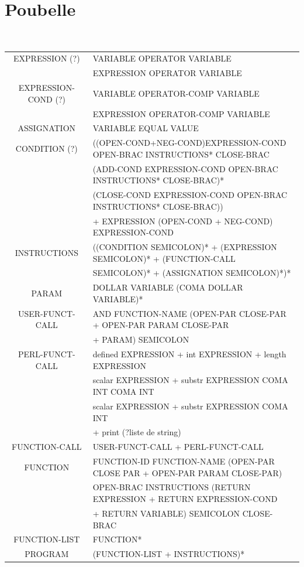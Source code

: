 \documentclass[a4paper,10pt]{article}
\begin{document}
\section{Poubelle}





~\\
\pagebreak
\hspace{-4.5cm}\begin{tabular}{|c|l|}
\hline
EXPRESSION (?)		& VARIABLE OPERATOR VARIABLE   \\
					& EXPRESSION OPERATOR VARIABLE \\ \hline
EXPRESSION-COND (?)	& VARIABLE OPERATOR-COMP VARIABLE   \\
					& EXPRESSION OPERATOR-COMP VARIABLE \\ \hline
ASSIGNATION			& VARIABLE EQUAL VALUE \\ \hline
CONDITION (?)		& ((OPEN-COND+NEG-COND)EXPRESSION-COND OPEN-BRAC INSTRUCTIONS* CLOSE-BRAC\\
					& (ADD-COND EXPRESSION-COND OPEN-BRAC INSTRUCTIONS* CLOSE-BRAC)* \\
					& (CLOSE-COND EXPRESSION-COND OPEN-BRAC INSTRUCTIONS* CLOSE-BRAC))\\
					& + EXPRESSION (OPEN-COND + NEG-COND) EXPRESSION-COND \\ \hline
INSTRUCTIONS		& ((CONDITION SEMICOLON)* + (EXPRESSION SEMICOLON)* + (FUNCTION-CALL \\ 
					& SEMICOLON)* + (ASSIGNATION SEMICOLON)*)* \\ \hline
PARAM				& DOLLAR VARIABLE (COMA DOLLAR VARIABLE)* \\ \hline
USER-FUNCT-CALL		& AND FUNCTION-NAME (OPEN-PAR CLOSE-PAR + OPEN-PAR PARAM CLOSE-PAR  \\
					& + PARAM) SEMICOLON \\ \hline
PERL-FUNCT-CALL		& defined EXPRESSION + int EXPRESSION + length EXPRESSION \\ 
					& scalar EXPRESSION + substr EXPRESSION COMA INT COMA INT \\
					& scalar EXPRESSION + substr EXPRESSION COMA INT  \\
					& + print (?liste de string) \\ \hline
FUNCTION-CALL		& USER-FUNCT-CALL + PERL-FUNCT-CALL \\ \hline
FUNCTION			& FUNCTION-ID FUNCTION-NAME (OPEN-PAR CLOSE PAR + OPEN-PAR PARAM CLOSE-PAR) \\
					& OPEN-BRAC INSTRUCTIONS (RETURN EXPRESSION + RETURN EXPRESSION-COND \\
					& + RETURN VARIABLE) SEMICOLON CLOSE-BRAC \\ \hline
FUNCTION-LIST		& FUNCTION* \\ \hline
PROGRAM				& (FUNCTION-LIST + INSTRUCTIONS)*\\ \hline

					
					
\end{tabular}
\end{document}
